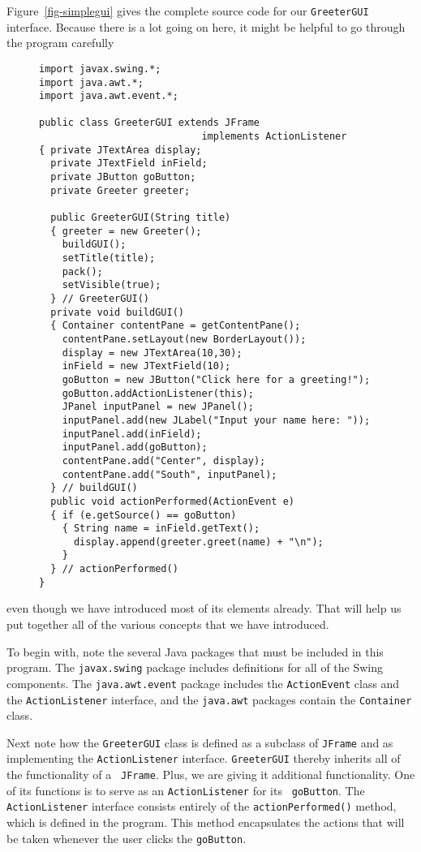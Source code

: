 Figure~\ref{fig-simplegui} gives the complete source code
for our {\tt GreeterGUI} interface. Because there is a lot going
on here, it might be helpful to go through the program carefully
\begin{figure}[h!]
\jjjprogstart
\begin{jjjlisting}
\begin{lstlisting}
import javax.swing.*;
import java.awt.*;
import java.awt.event.*;

public class GreeterGUI extends JFrame 
                            implements ActionListener 
{ private JTextArea display;
  private JTextField inField;
  private JButton goButton;
  private Greeter greeter;
	    
  public GreeterGUI(String title) 
  { greeter = new Greeter();  
    buildGUI();
    setTitle(title);
    pack();
    setVisible(true);
  } // GreeterGUI()
  private void buildGUI() 
  { Container contentPane = getContentPane();
    contentPane.setLayout(new BorderLayout());
    display = new JTextArea(10,30);
    inField = new JTextField(10);
    goButton = new JButton("Click here for a greeting!");
    goButton.addActionListener(this);
    JPanel inputPanel = new JPanel();
    inputPanel.add(new JLabel("Input your name here: "));
    inputPanel.add(inField);
    inputPanel.add(goButton);
    contentPane.add("Center", display);
    contentPane.add("South", inputPanel);
  } // buildGUI()
  public void actionPerformed(ActionEvent e) 
  { if (e.getSource() == goButton) 
    { String name = inField.getText();
      display.append(greeter.greet(name) + "\n");
    }
  } // actionPerformed()
}
\end{lstlisting}
\end{jjjlisting}
\end{figure}
even though we have introduced most of its elements already. That
will help us put  together all of the various concepts that
we have introduced.

To begin with, note the several Java packages that must be included in
this program. The {\tt javax.swing} package includes definitions for
all of the Swing components. The {\tt java.awt.event} package includes
the {\tt ActionEvent} class and the {\tt ActionListener} interface,
and the {\tt java.awt} packages contain the {\tt Container} class.

Next note how the {\tt GreeterGUI} class is defined as a subclass of
{\tt JFrame} and as implementing the {\tt ActionListener} interface.
{\tt GreeterGUI} thereby inherits all of the functionality of a {\tt
JFrame}.  Plus, we are giving it additional functionality. One of its
functions is to serve as an {\tt ActionListener} for its {\tt
goButton}.  The {\tt ActionListener} interface consists entirely of
the {\tt actionPerformed()} method, which is defined in the program.
This method encapsulates the actions that will be taken whenever the
user clicks the {\tt goButton}.

